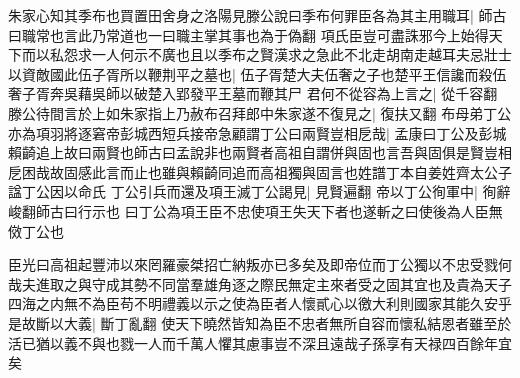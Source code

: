 朱家心知其季布也買置田舍身之洛陽見滕公說曰季布何罪臣各為其主用職耳|{
	師古曰職常也言此乃常道也一曰職主掌其事也為于偽翻}
項氏臣豈可盡誅邪今上始得天下而以私怨求一人何示不廣也且以季布之賢漢求之急此不北走胡南走越耳夫忌壯士以資敵國此伍子胥所以鞭荆平之墓也|{
	伍子胥楚大夫伍奢之子也楚平王信讒而殺伍奢子胥奔吳藉吳師以破楚入郢發平王墓而鞭其尸}
君何不從容為上言之|{
	從千容翻}
滕公待間言於上如朱家指上乃赦布召拜郎中朱家遂不復見之|{
	復扶又翻}
布母弟丁公亦為項羽將逐窘帝彭城西短兵接帝急顧謂丁公曰兩賢豈相戹哉|{
	孟康曰丁公及彭城賴齮追上故曰兩賢也師古曰孟說非也兩賢者高祖自謂併與固也言吾與固俱是賢豈相戹困哉故固感此言而止也雖與賴齮同追而高祖獨與固言也姓譜丁本自姜姓齊太公子諡丁公因以命氏}
丁公引兵而還及項王滅丁公謁見|{
	見賢遍翻}
帝以丁公徇軍中|{
	徇辭峻翻師古曰行示也}
曰丁公為項王臣不忠使項王失天下者也遂斬之曰使後為人臣無傚丁公也

臣光曰高祖起豐沛以來罔羅豪桀招亡納叛亦已多矣及即帝位而丁公獨以不忠受戮何哉夫進取之與守成其勢不同當羣雄角逐之際民無定主來者受之固其宜也及貴為天子四海之内無不為臣苟不明禮義以示之使為臣者人懷貳心以徼大利則國家其能久安乎是故斷以大義|{
	斷丁亂翻}
使天下曉然皆知為臣不忠者無所自容而懷私結恩者雖至於活已猶以義不與也戮一人而千萬人懼其慮事豈不深且遠哉子孫享有天禄四百餘年宜矣

